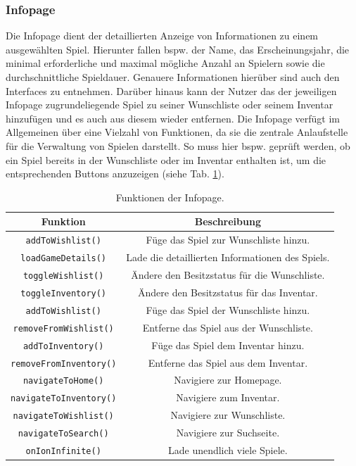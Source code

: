 \subsubsection{Infopage}
Die Infopage dient der detaillierten Anzeige von Informationen zu einem ausgewählten Spiel.
Hierunter fallen bspw. der Name, das Erscheinungsjahr, die minimal erforderliche und maximal mögliche Anzahl an Spielern sowie die durchschnittliche Spieldauer.
Genauere Informationen hierüber sind auch den Interfaces zu entnehmen.
Darüber hinaus kann der Nutzer das der jeweiligen Infopage zugrundeliegende Spiel zu seiner Wunschliste oder seinem Inventar hinzufügen und es auch aus diesem wieder entfernen.
Die Infopage verfügt im Allgemeinen über eine Vielzahl von Funktionen, da sie die zentrale Anlaufstelle für die Verwaltung von Spielen darstellt.
So muss hier bspw. geprüft werden, ob ein Spiel bereits in der Wunschliste oder im Inventar enthalten ist, um die entsprechenden Buttons anzuzeigen (siehe Tab. \ref{tab:infopage}).
\begin{table}[H]
    \centering
    \begin{tabular}{|c|c|}
        \hline
        \textbf{Funktion} & \textbf{Beschreibung} \\
        \hline
        \texttt{addToWishlist()} & Füge das Spiel zur Wunschliste hinzu. \\
        \texttt{loadGameDetails()} & Lade die detaillierten Informationen des Spiels. \\
        \texttt{toggleWishlist()} & Ändere den Besitzstatus für die Wunschliste. \\
        \texttt{toggleInventory()} & Ändere den Besitzstatus für das Inventar. \\
        \texttt{addToWishlist()} & Füge das Spiel der Wunschliste hinzu. \\
        \texttt{removeFromWishlist()} & Entferne das Spiel aus der Wunschliste. \\
        \texttt{addToInventory()} & Füge das Spiel dem Inventar hinzu. \\
        \texttt{removeFromInventory()} & Entferne das Spiel aus dem Inventar. \\
        \texttt{navigateToHome()} & Navigiere zur Homepage. \\
        \texttt{navigateToInventory()} & Navigiere zum Inventar. \\
        \texttt{navigateToWishlist()} & Navigiere zur Wunschliste. \\
        \texttt{navigateToSearch()} & Navigiere zur Suchseite. \\
        \texttt{onIonInfinite()} & Lade unendlich viele Spiele. \\
        \hline
    \end{tabular}
    \caption{Funktionen der Infopage.}
    \label{tab:infopage}
\end{table}
